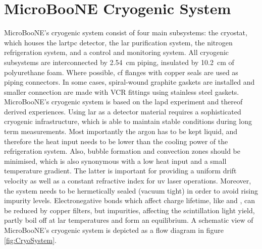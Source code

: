 \section{MicroBooNE Cryogenic System}
MicroBooNE's cryogenic system consist of four main subsystems: the cryostat, which houses the \gls{lartpc} detector, the \gls{lar} purification system, the nitrogen refrigeration system, and a control and monitoring system. All cryogenic subsystems are interconnected by \SI{2.54}{\centi\metre} piping, insulated by \SI{10.2}{\centi\metre} of polyurethane foam. Where possible, \gls{cf} flanges with copper seals are used as piping connectors. In some cases, spiral-wound graphite gaskets are installed and smaller connection are made with VCR fittings using stainless steel gaskets. MicroBooNE's cryogenic system is based on the \gls{lapd} experiment \cite{LAPDPaper} and thereof derived experiences. Using \gls{lar} as a detector material requires a sophisticated cryogenic infrastructure, which is able to maintain stable conditions during long term measurements. Most importantly the argon has to be kept liquid, and therefore the heat input needs to be lower than the cooling power of the refrigeration system. Also, bubble formation and convection zones should be minimised, which is also synonymous with a low heat input and a small temperature gradient. The latter is important for providing a uniform drift velocity as well as a constant refractive index for \gls{uv} laser operations. Moreover, the system needs to be hermetically sealed (vacuum tight) in order to avoid rising impurity levels. Electronegative bonds which affect charge lifetime, like  and , can be reduced by copper filters, but  impurities, affecting the scintillation light yield, partly boil off at \gls{lar} temperatures and form an equilibrium. A schematic view of MicroBooNE's cryogenic system is depicted as a flow diagram in figure \ref{fig:CryoSystem}.
